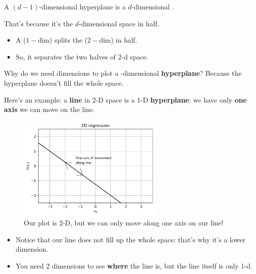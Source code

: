         \phantom{}

        \begin{notation}
            A $(d-1)$-dimensional hyperplane is a $d$-dimensional .

            That's because it's  the $d$-dimensional space in half.

            \begin{itemize}
                \item \miniex A  ($1-$dim) splits the  ($2-$dim) in half.
                \item So, it separates the two halves of 2-d space.
            \end{itemize}
        \end{notation}
        
        Why do we need  dimensions to plot a -dimensional \textbf{hyperplane}? Because the hyperplane doesn't fill the whole space.
        
        Here's an example: a \textbf{line} in 2-D space is a 1-D \textbf{hyperplane}: we have only \textbf{one axis} we can move on the line.
            
        \begin{figure}[H]
            \centering
            
            \includegraphics[width=70mm,scale=0.5]{images/classification_images/2d_regression_1d_hyperplane.png}
            \caption*{Our plot is 2-D, but we can only move along one axis on our line!}
        \end{figure}    

        \begin{itemize} 
            \item Notice that our line does not fill up the whole space: that's why it's a lower dimension.
            \item You need 2 dimensions to see \textbf{where} the line is, but the line itself is only 1-d.
        \end{itemize}

